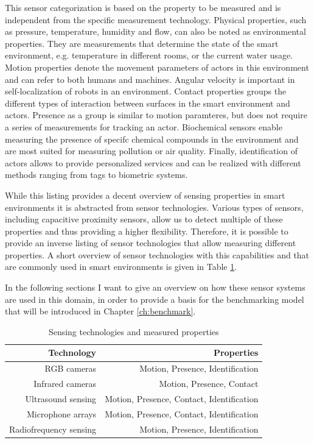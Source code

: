 This sensor categorization is based on the property to be measured and is independent from the specific measurement technology. Physical properties, such as pressure, temperature, humidity and flow, can also be noted as environmental properties. They are measurements that determine the state of the smart environment, e.g. temperature in different rooms, or the current water usage. Motion properties denote the movement parameters of actors in this environment and can refer to both humans and machines. Angular velocity is important in self-localization of robots in an environment. Contact properties groups the different types of interaction between surfaces in the smart environment and actors. Presence as a group is similar to motion paramteres, but does not require a series of measurements for tracking an actor. Biochemical sensors enable measuring the presence of specifc chemical compounds in the environment and are most suited for measuring pollution or air quality. Finally, identification of actors allows to provide personalized services and can be realized with different methods ranging from tags to biometric systems.

While this listing provides a decent overview of sensing properties in smart environments it is abstracted from sensor technologies. Various types of sensors, including capacitive proximity sensors, allow us to detect multiple of these properties and thus providing a higher flexibility. Therefore, it is possible to provide an inverse listing of sensor technologies that allow measuring different properties. A short overview of sensor technologies with this capabilities and that are commonly used in smart environments is given in Table \ref{tab:sen_tech_prop}. 

In the following sections I want to give an overview on how these sensor systems are used in this domain, in order to provide a basis for the benchmarking model that will be introduced in Chapter \ref{ch:benchmark}.
\begin{table}[htbp]
  \centering
  \caption{Sensing technologies and measured properties}
    \begin{tabular}{rr}
    \toprule
    \textbf{Technology} & \textbf{Properties} \\
    \midrule
    RGB cameras  & Motion, Presence, Identification \\ \addlinespace
    Infrared cameras & Motion, Presence, Contact \\ \addlinespace
    Ultrasound sensing & Motion, Presence, Contact, Identification \\ \addlinespace
    Microphone arrays & Motion, Presence, Contact, Identification \\ \addlinespace
    Radiofrequency sensing & Motion, Presence, Identification \\
    \bottomrule
    \end{tabular}%
  \label{tab:sen_tech_prop}%
\end{table}%

